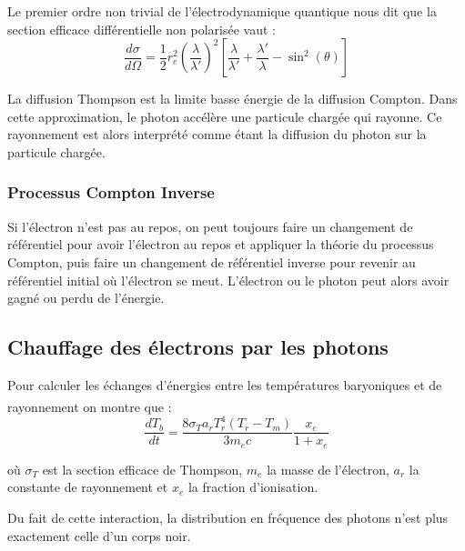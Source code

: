 \documentclass[10pt, a4paper]{report}
\numberwithin{equation}{subsection}
\begin{document}
 Le premier ordre non trivial de l'électrodynamique quantique nous dit que la section efficace différentielle non polarisée vaut :
\begin{equation} \label{eq:QED}
\boxed{\frac{d\sigma}{d\Omega} = \frac{1}{2} r_e^2 \left(\frac{\lambda}{\lambda'}\right)^{2} \left[\frac{\lambda}{\lambda'} + \frac{\lambda'}{\lambda} - \sin^2(\theta)\right]}
\end{equation}

La diffusion Thompson est la limite basse énergie de la diffusion Compton. Dans cette approximation, le photon accélère une particule chargée qui rayonne. Ce rayonnement est alors interprété comme étant la diffusion du photon sur la particule chargée. 

\subsubsection{Processus Compton Inverse}
Si l'électron n'est pas au repos, on peut toujours faire un changement de référentiel pour avoir l'électron au repos et appliquer la théorie du processus Compton, puis faire un changement de référentiel inverse pour revenir au référentiel initial où l'électron se meut. L'électron ou le photon peut alors avoir gagné ou perdu de l'énergie.


\subsection{Chauffage des électrons par les photons}

Pour calculer les échanges d'énergies entre les températures baryoniques et de rayonnement on montre que \textsuperscript{\cite{PEEBLESBOOK}} : 
\begin{equation} \label{eq:ITBTR}
\boxed{\frac{dT_b}{dt} = \frac{8\sigma_Ta_rT_r^4(T_r-T_m)}{3m_ec}\frac{x_e}{1+x_e}}
\end{equation}

 où $\sigma_T$ est la section efficace de Thompson, $m_e$ la masse de l'électron, $a_r$ la constante de rayonnement et $x_e$ la fraction d'ionisation.

Du fait de cette interaction, la distribution en fréquence des photons n'est plus exactement celle d'un corps noir.   
 
\end{document}
